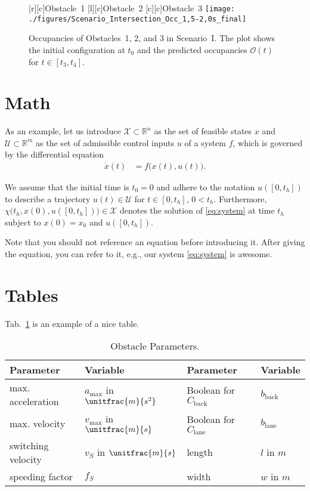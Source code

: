 \begin{figure}[!htpb]
\centering
	\footnotesize
	[c]{Obstacle~1}	
	[c]{Obstacle~2}
	[c]{Obstacle~3}
	\texttt{[image: ./figures/Scenario\_Intersection\_Occ\_1,5-2,0s\_final]}
\caption{Occupancies of Obstacles~1, 2, and 3 in Scenario~I. The plot shows the initial configuration at $t_{0}$ and the predicted occupancies $\mathcal{O}(t)$ for ${t \in [t_{3}, t_{4}]}$.}
\label{fig:scenario1}
\end{figure}

\section{Math}
As an example, let us introduce $\mathcal{X}\subset\mathbb{R}^n$ as the set of feasible states $x$ and $\mathcal{U}\subset\mathbb{R}^m$ as the set of admissible control inputs $u$ of a system $f$, which is governed by the differential equation
\begin{equation}
	\begin{split}
	\dot{x}(t) &= f\big(x(t),u(t)\big). %
	\end{split}
	\label{eq:system}
\end{equation}

We assume that the initial time is $t_0 = 0$ and adhere to the notation $u([0, t_h])$ to describe a trajectory $u(t)\in\mathcal{U}$ for $t\in [0,t_h]$, $0<t_h$. Furthermore, $\chi\big(t_h,x(0),u([0,t_h])\big)\in\mathcal{X}$ denotes the solution of \eqref{eq:system} at time $t_h$ subject to $x(0)=x_0$ and $u([0,t_h])$.

Note that you should not reference an equation before introducing it. After giving the equation, you can refer to it, e.g., our system \eqref{eq:system} is awesome.


\section{Tables}
Tab.~\ref{tab:parameters} is an example of a nice table.

\begin{table}[!htb]\centering
\caption{Obstacle Parameters.}
\begin{tabular}{@{}llll@{}} \toprule
\textbf{Parameter} & \textbf{Variable} & \textbf{Parameter} &  \textbf{Variable} \\ \midrule
max. acceleration & $a_\mathrm{max}$ in $\unitfrac{m}{s^2}$ & Boolean for $C_\mathrm{back}$ & $b_\mathrm{back}$ \\ 
max. velocity & $v_\mathrm{max}$ in $\unitfrac{m}{s}$ & Boolean for $C_\mathrm{lane}$ & $b_\mathrm{lane}$ \\
switching velocity & $v_S$ in $\unitfrac{m}{s}$ & length & $l$ in $\unit{m}$ \\
speeding factor & $f_S$ & width & $w$ in $\unit{m}$ \\
\bottomrule
\end{tabular}
\label{tab:parameters}
\end{table}


